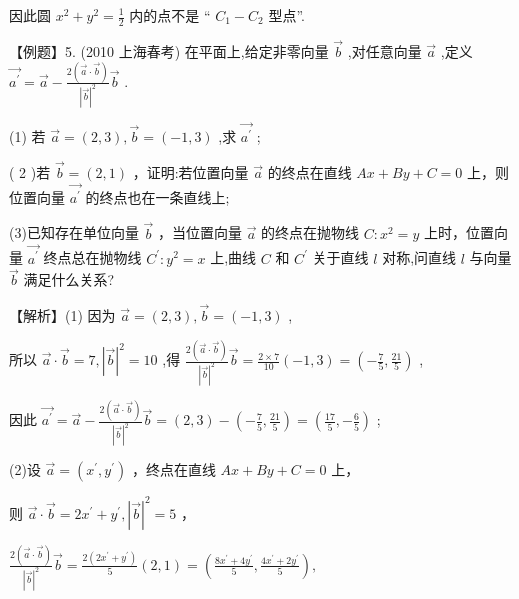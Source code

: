 \documentclass[10pt]{article}
\begin{document}
因此圆 \({x}^{2} + {y}^{2} = \frac{1}{2}\) 内的点不是 “ \({C}_{1} - {C}_{2}\) 型点”.

【例题】5. (2010 上海春考) 在平面上,给定非零向量 \(\overrightarrow{b}\) ,对任意向量 \(\overrightarrow{a}\) ,定义 \(\overrightarrow{{a}^{\prime }} = \overrightarrow{a} - \frac{2\left( {\overrightarrow{a} \cdot  \overrightarrow{b}}\right) }{{\left| \overrightarrow{b}\right| }^{2}}\overrightarrow{b}\) .

(1) 若 \(\overrightarrow{a} = \left( {2,3}\right) ,\overrightarrow{b} = \left( {-1,3}\right)\) ,求 \(\overrightarrow{{a}^{\prime }}\) ;

( 2 )若 \(\overrightarrow{b} = \left( {2,1}\right)\) ，证明:若位置向量 \(\overrightarrow{a}\) 的终点在直线 \({Ax} + {By} + C = 0\) 上，则位置向量 \(\overrightarrow{{a}^{\prime }}\) 的终点也在一条直线上;

(3)已知存在单位向量 \(\overrightarrow{b}\) ，当位置向量 \(\overrightarrow{a}\) 的终点在抛物线 \(C : {x}^{2} = y\) 上时，位置向量 \(\overrightarrow{{a}^{\prime }}\) 终点总在抛物线 \({C}^{\prime } : {y}^{2} = x\) 上,曲线 \(C\) 和 \({C}^{\prime }\) 关于直线 \(l\) 对称,问直线 \(l\) 与向量 \(\overrightarrow{b}\) 满足什么关系?

【解析】(1) 因为 \(\overrightarrow{a} = \left( {2,3}\right) ,\overrightarrow{b} = \left( {-1,3}\right)\) ,

所以 \(\overrightarrow{a} \cdot  \overrightarrow{b} = 7,{\left| \overrightarrow{b}\right| }^{2} = {10}\) ,得 \(\frac{2\left( {\overrightarrow{a} \cdot  \overrightarrow{b}}\right) }{{\left| \overrightarrow{b}\right| }^{2}}\overrightarrow{b} = \frac{2 \times  7}{10}\left( {-1,3}\right)  = \left( {-\frac{7}{5},\frac{21}{5}}\right)\) ,

因此 \(\overrightarrow{{a}^{\prime }} = \overrightarrow{a} - \frac{2\left( {\overrightarrow{a} \cdot  \overrightarrow{b}}\right) }{{\left| \overrightarrow{b}\right| }^{2}}\overrightarrow{b} = \left( {2,3}\right)  - \left( {-\frac{7}{5},\frac{21}{5}}\right)  = \left( {\frac{17}{5}, - \frac{6}{5}}\right)\) ;

(2)设 \(\overrightarrow{a} = \left( {{x}^{\prime },{y}^{\prime }}\right)\) ，终点在直线 \({Ax} + {By} + C = 0\) 上，

则 \(\overrightarrow{a} \cdot  \overrightarrow{b} = 2{x}^{\prime } + {y}^{\prime },{\left| \overrightarrow{b}\right| }^{2} = 5\) ，

\(\frac{2\left( {\overrightarrow{a} \cdot  \overrightarrow{b}}\right) }{{\left| \overrightarrow{b}\right| }^{2}}\overrightarrow{b} = \frac{2\left( {2{x}^{\prime } + {y}^{\prime }}\right) }{5}\left( {2,1}\right)  = \left( {\frac{8{x}^{\prime } + 4{y}^{\prime }}{5},\frac{4{x}^{\prime } + 2{y}^{\prime }}{5}}\right) ,\)
\end{document}
